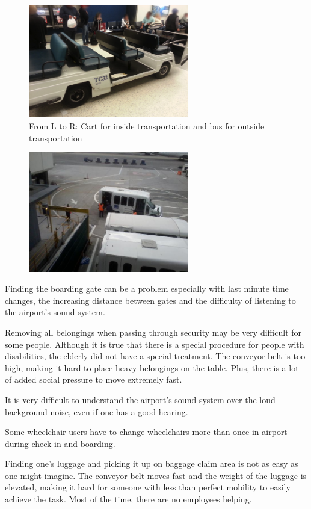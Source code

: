 \begin{list}{-}{}
\begin{figure}[h]
  \centering
     \includegraphics[width=7cm]{images/image037}
   \caption{From L to R: Cart for inside transportation and bus for outside transportation}
  \label{fig:37}
\end{figure}
\begin{figure}[h]
  \centering
     \includegraphics[width=7cm]{images/image038}
  \label{fig:38}
\end{figure}


  \item Finding the boarding gate can be a problem especially with last minute time changes, the increasing distance between gates and the difficulty of listening to the airport’s sound system.
  \item Removing all belongings when passing through security may be very difficult for some people. Although it is true that there is a special procedure for people with disabilities, the elderly did not have a special treatment.  The conveyor belt is too high, making it hard to place heavy belongings on the table. Plus, there is a lot of added social pressure to move extremely fast.
  \item It is very difficult to understand the airport’s sound system over the loud background noise, even if one has a good hearing.
  \item Some wheelchair users have to change wheelchairs more than once in airport during check-in and boarding.
  \item Finding one’s luggage and picking it up on baggage claim area is not as easy as one might imagine. The conveyor belt moves fast and the weight of the luggage is elevated, making it hard for someone with less than perfect mobility to easily achieve the task. Most of the time, there are no employees helping.


\end{list}
